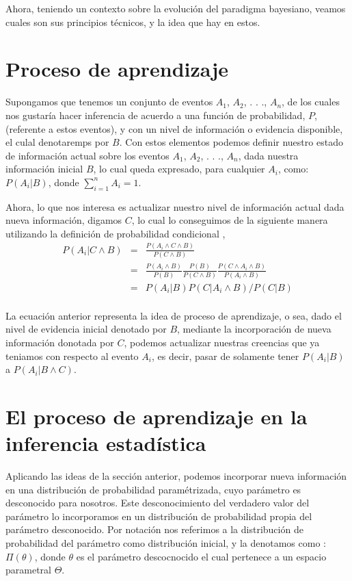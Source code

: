 Ahora, teniendo un contexto sobre la evolución del paradigma bayesiano, veamos cuales son sus principios técnicos, y la idea que hay en estos.

\section{Proceso de aprendizaje}  

Supongamos que tenemos un conjunto de eventos $A_{1}$, $A_{2}$, . . ., $A_{n}$, de los cuales nos gustaría hacer inferencia de acuerdo a una función de probabilidad, $P$, (referente a estos eventos), y con un nivel de información o evidencia disponible, el culal denotaremps por $B$. Con estos elementos podemos definir nuestro estado de información actual sobre los eventos $A_{1}$, $A_{2}$, . . ., $A_{n}$, dada nuestra información inicial $B$, lo cual queda expresado, para cualquier $A_{i}$, como: $P(A_{i}|B)$, donde $\sum_{i=1}^{n}A_{i}=1$.

Ahora, lo que nos interesa es actualizar nuestro nivel de información actual dada nueva información, digamos $C$, lo cual lo conseguimos de la siguiente manera utilizando la definición de probabilidad condicional \cite{Ross_Book},
\begin{eqnarray}
	P(A_{i}|C \wedge B)&=&\frac{P(A_{i} \wedge C \wedge B)}{P(C \wedge B)} \nonumber \\
	&=& \frac{P(A_{i} \wedge B)}{P(B)} \frac{P(B)}{P(C \wedge B)} \frac{P(C \wedge A_{i} \wedge B)}{P(A_{i} \wedge B)} \nonumber\\
	&=& P(A_{i}|B)P(C | A_{i} \wedge B)/P(C | B) \nonumber\\
\end{eqnarray} 

La ecuación anterior representa la idea de proceso de aprendizaje, o sea, dado el nivel de evidencia inicial denotado por $B$, mediante la incorporación de nueva información donotada por $C$, podemos actualizar nuestras creencias que ya teniamos con respecto al evento $A_{i}$, es decir, pasar de solamente tener $P(A_{i}|B)$ a $P(A_{i}|B \wedge C)$.

\section{El proceso de aprendizaje en la inferencia estadística}

Aplicando las ideas de la sección anterior, podemos incorporar nueva información en una distribución de probabilidad paramétrizada, cuyo parámetro es desconocido para nosotros. Este desconocimiento del verdadero valor del parámetro lo incorporamos en un distribución de probabilidad propia del parámetro desconocido. Por notación nos referimos a la distribución de probabilidad del parámetro como distribución inicial, y la denotamos como : $\Pi(\theta)$, donde $\theta$ es el parámetro descocnocido el cual pertenece a un espacio parametral $\Theta$.

